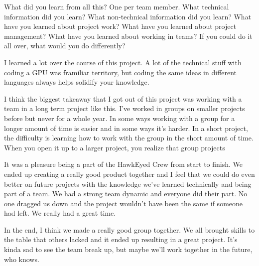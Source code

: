 What did you learn from all this? One per team member.
What technical information did you learn?
What non-technical information did you learn?
What have you learned about project work?
What have you learned about project management?
What have you learned about working in teams?
If you could do it all over, what would you do differently?
\par
I learned a lot over the course of this project. A lot of the technical stuff with coding a GPU was framiliar territory, but coding the same ideas in different languages always helps solidify your knowledge. 
\par
I think the biggest takeaway that I got out of this project was working with a team in a long term project like this. I've worked in groups on smaller projects before but never for a whole year. In some ways working with a group for a longer amount of time is easier and in some ways it's harder. In a short project, the difficulty is learning how to work with the group in the short amount of time. When you open it up to a larger project, you realize that group projects 
\par
It was a pleasure being a part of the HawkEyed Crew from start to finish. We ended up creating a really good product together and I feel that we could do even better on future projects with the knowledge we've learned technically and being part of a team. We had a strong team dynamic and everyone did their part. No one dragged us down and the project wouldn't have been the same if someone had left. We really had a great time.
\par
In the end, I think we made a really good group together. We all brought skills to the table that others lacked and it ended up resulting in a great project. It's kinda sad to see the team break up, but maybe we'll work together in the future, who knows.
